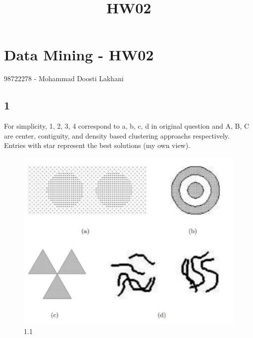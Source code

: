 \documentclass[11pt]{article}
\title{HW02}
\makeatletter
\def\maxwidth{\ifdim\Gin@nat@width>\linewidth\linewidth
    \else\Gin@nat@width\fi}
\let\Oldincludegraphics\includegraphics
\renewcommand{\includegraphics}[1]{\Oldincludegraphics[width=.8\maxwidth]{#1}}
\makeatother
\begin{document}
    
    
    \maketitle
    
    

    
    \hypertarget{data-mining---hw02}{%
\section{Data Mining - HW02}\label{data-mining---hw02}}

98722278 - Mohammad Doosti Lakhani

    \hypertarget{section}{%
\subsection{1}\label{section}}

For simplicity, 1, 2, 3, 4 correspond to a, b, c, d in original question
and A, B, C are center, contiguity, and density based clustering
approachs respectively. Entries with star represent the best solutions
(my own view).

\begin{figure}
\centering
\includegraphics{wiki/1.1.jpg}
\caption{1.1}
\end{figure}
\end{document}
